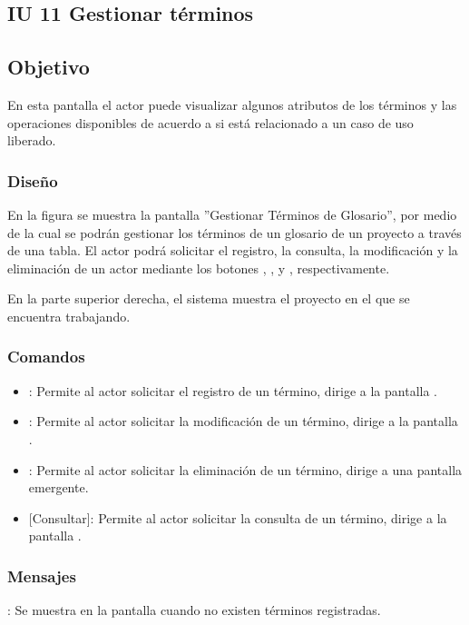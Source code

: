\subsection{IU 11 Gestionar términos}

\subsection{Objetivo}
	En esta pantalla el actor puede visualizar algunos atributos de los términos y las operaciones disponibles de acuerdo a si está relacionado a un caso de uso liberado.
\subsubsection{Diseño}
	En la figura  se muestra la pantalla ''Gestionar Términos de Glosario'', por medio de la cual se podrán gestionar los términos de un glosario de un proyecto a través de una tabla. El actor podrá solicitar el registro, la consulta, la modificación y la eliminación de un actor mediante los botones , , \editar y \eliminar, respectivamente.
	
	En la parte superior derecha, el sistema muestra el proyecto en el que se encuentra trabajando.

\subsubsection{Comandos}
\begin{itemize}
	\item {}: Permite al actor solicitar el registro de un término, dirige a la pantalla .
	\item \editar [Modificar]: Permite al actor solicitar la modificación de un término, dirige a la pantalla .
	\item \eliminar [Eliminar]: Permite al actor solicitar la eliminación de un término, dirige a una pantalla emergente.
	\item {} [Consultar]: Permite al actor solicitar la consulta de un término, dirige a la pantalla  .
\end{itemize}
\subsubsection{Mensajes}

\begin{Citemize}
	\item {}: Se muestra en la pantalla  cuando no existen términos registradas.
\end{Citemize}
